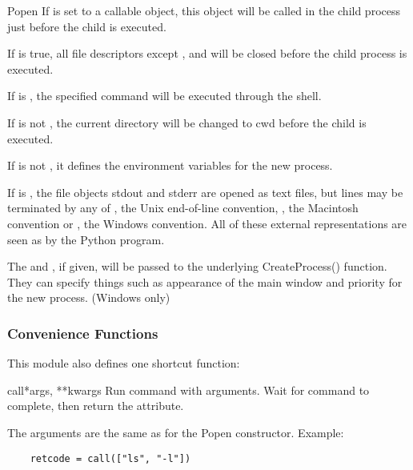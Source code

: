 \begin{classdesc}{Popen}
If  is set to a callable object, this object will be
called in the child process just before the child is executed.

If  is true, all file descriptors except ,
 and  will be closed before the child process is
executed.

If  is , the specified command will be
executed through the shell.

If  is not , the current directory will be changed
to cwd before the child is executed.

If  is not , it defines the environment variables
for the new process.

If  is , the file objects stdout
and stderr are opened as text files, but lines may be terminated by
any of , the Unix end-of-line convention, ,
the Macintosh convention or , the Windows convention.
All of these external representations are seen as  by the
Python program.  

The  and , if given, will be
passed to the underlying CreateProcess() function.  They can specify
things such as appearance of the main window and priority for the new
process.  (Windows only)
\end{classdesc}

\subsubsection{Convenience Functions}

This module also defines one shortcut function:

\begin{funcdesc}{call}{*args, **kwargs}
Run command with arguments.  Wait for command to complete, then
return the  attribute.

The arguments are the same as for the Popen constructor.  Example:

\begin{verbatim}
    retcode = call(["ls", "-l"])
\end{verbatim}
\end{funcdesc}


